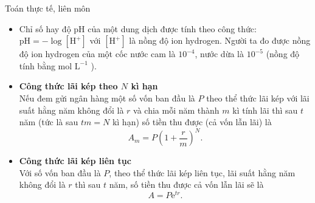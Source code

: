 \begin{dang}{Toán thực tế, liên môn}
	\begin{itemize}
		\item Chỉ số hay độ pH của một dung dịch được tính theo công thức: $\mathrm{pH}=-\log  \left[\mathrm{H}^{+}\right]$ với $\left[\mathrm{H}^{+}\right]$ là nồng độ ion hydrogen. Người ta đo được nồng độ ion hydrogen của một cốc nước cam là $10^{-4}$, nước dừa là $10^{-5}$ (nồng độ tính bằng mol $\mathrm{L}^{-1}$ ).
		\item {\bf Công thức lãi kép theo $N$ kì hạn} \\
		Nếu đem gửi ngân hàng một số vốn ban đầu là $P$ theo thể thức lãi kép với lãi suất hằng năm không đổi là $r$ và chia mỗi năm thành $m$ kì tính lãi thì sau $t$ năm (tức là sau $t m=N$ kì hạn) số tiền thu được (cả vốn lẫn lãi) là
		$$
		A_m=P\left(1+\dfrac{r}{m}\right)^{N} .
		$$
		\item {\bf Công thức lãi kép liên tục}\\
		Với số vốn ban đầu là $P$, theo thể thức lãi kép liên tục, lãi suất hằng năm không đổi là $r$ thì sau $t$ năm, số tiền thu được cả vốn lẫn lãi sẽ là
		$$
		A=P \mathrm{e}^{t r}.
		$$
	\end{itemize}
\end{dang}
